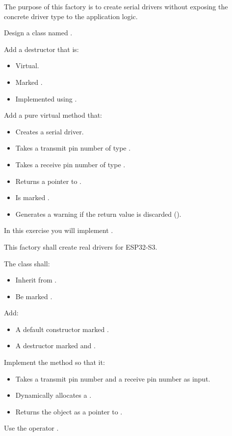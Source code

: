 The purpose of this factory is to create serial drivers without exposing the concrete driver type
to the application logic.

Design a class named .

Add a destructor that is:
\begin{itemize}
  \item Virtual.
  \item Marked .
  \item Implemented using .
\end{itemize}

Add a pure virtual method  that:
\begin{itemize}
  \item Creates a serial driver.
  \item Takes a transmit pin number of type .
  \item Takes a receive pin number of type .
  \item Returns a pointer to .
  \item Is marked .
  \item Generates a warning if the return value is discarded (\code{[[nodiscard]]}).
\end{itemize}

\label{c4:ex:2.2}
In this exercise you will implement .

This factory shall create real drivers for ESP32-S3.

The class shall:
\begin{itemize}
  \item Inherit from .
  \item Be marked .
\end{itemize}

Add:
\begin{itemize}
  \item A default constructor marked .
  \item A destructor marked  and .
\end{itemize}

Implement the method  so that it:
\begin{itemize}
  \item Takes a transmit pin number and a receive pin number as input.
  \item Dynamically allocates a .
  \item Returns the object as a pointer to .
\end{itemize}
Use the operator .

